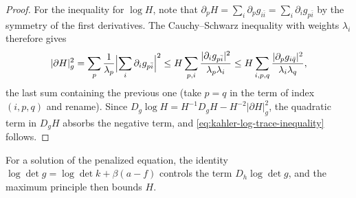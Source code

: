 \begin{proof}
For the inequality for $\log H$, note that $\partial_pH=\sum_i\partial_pg_{i\bar i}=\sum_i\partial_ig_{p\bar i}$ by the symmetry of the first derivatives. The Cauchy--Schwarz inequality with weights $\lambda_i$ therefore gives
\[
 |\partial H|_g^2
 =\sum_p\frac1{\lambda_p}\Bigl|\sum_i\partial_ig_{p\bar i}\Bigr|^2
 \leq H\sum_{p,i}\frac{|\partial_ig_{p\bar i}|^2}
                           {\lambda_p\lambda_i}
 \leq H\sum_{i,p,q}\frac{|\partial_pg_{i\bar q}|^2}
                           {\lambda_i\lambda_q},
\]
the last sum containing the previous one (take $p=q$ in the term of index $(i,p,q)$ and rename). Since $D_g\log H=H^{-1}D_gH-H^{-2}|\partial H|_g^2$, the quadratic term in $D_gH$ absorbs the negative term, and \eqref{eq:kahler-log-trace-inequality} follows.
\end{proof}

For a solution of the penalized equation, the identity $\log\det g=\log\det k+\beta(a-f)$ controls the term $D_h\log\det g$, and the maximum principle then bounds $H$.

